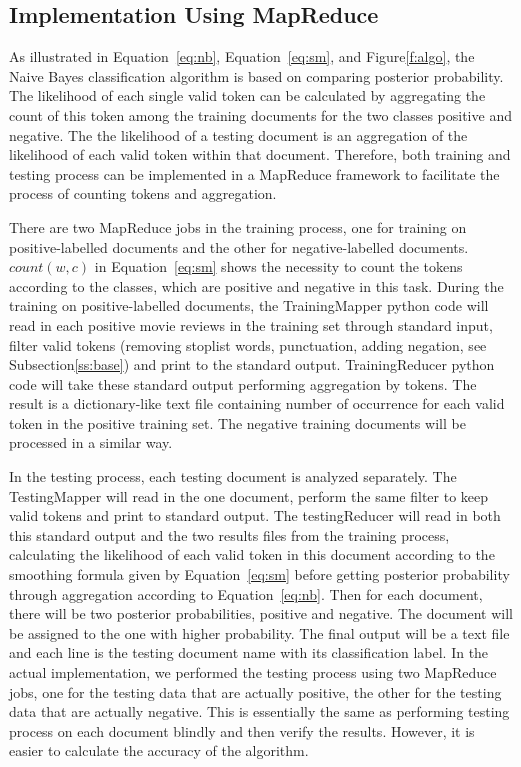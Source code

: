 \subsection{Implementation Using MapReduce}

As illustrated in Equation~\ref{eq:nb}, Equation~\ref{eq:sm}, and 
Figure\ref{f:algo}, the Naive Bayes classification algorithm is based on 
comparing posterior probability. The likelihood of each single valid token can 
be calculated by aggregating the count of this token among the training 
documents for the two classes positive and negative. The the likelihood of a 
testing document is an aggregation of the likelihood of each valid token 
within that document. Therefore, both training and testing process can be 
implemented in a MapReduce framework to facilitate the process of counting 
tokens and aggregation. 

There are two MapReduce jobs in the training process, one for training on 
positive-labelled documents and the other for negative-labelled documents. 
$count(w,c)$ in Equation~\ref{eq:sm} shows the necessity to count the 
tokens according to the classes, which are positive and negative in this task. 
During the training on positive-labelled documents, the TrainingMapper 
python code will read in each positive movie reviews in the training set 
through standard input, filter valid tokens (removing stoplist words, 
punctuation, adding negation, see Subsection\ref{ss:base}) and print to the 
standard output. TrainingReducer python code will take these standard 
output performing aggregation by tokens. The result is a dictionary-like text 
file containing number of occurrence for each valid token in the positive 
training set. The negative training documents will be processed in a similar 
way. 

 In the testing process, each testing document is analyzed separately. The 
 TestingMapper will read in the one document, perform the same filter to 
 keep valid tokens and print to standard output. The testingReducer will read 
 in both this standard output and the two results files from the training 
 process, calculating the likelihood of each valid token in this document 
 according to the smoothing formula given by Equation~\ref{eq:sm} before 
 getting posterior probability through aggregation according to 
 Equation~\ref{eq:nb}. Then for each document, there will be two posterior 
 probabilities, positive and negative. The document will be assigned to the 
 one with higher probability. The final output will be a text file and each line is 
 the testing document name with its classification label. In the actual 
 implementation, we performed the testing process using two MapReduce 
 jobs, one for the testing data that are actually positive, the other for the 
 testing data that are actually negative. This is essentially the same as 
 performing testing process on each document blindly and then verify the 
 results. However, it is easier to calculate the accuracy of the algorithm. 
 
